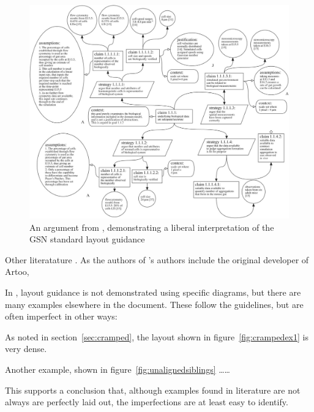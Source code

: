 \begin{itemize*}
\begin{figure}
    \includegraphics[width=\textwidth]{graphics/aldencentral.jpg}
    \caption{An argument from \cite{royal}, demonstrating a liberal interpretation of the GSN standard layout guidance}
    \label{fig:aldencentral}
\end{figure}

Other literatature  . As the authors of \cite{royal}'s authors include the original developer of Artoo, 

In \cite{gsnstandard}, layout guidance is not demonstrated using specific diagrams, but there are many examples elsewhere in the document. These follow the guidelines, but are often imperfect in other ways:

\begin{itemize*}
    \item As noted in section~\ref{sec:cramped}, the layout shown in figure~\ref{fig:crampedex1} is very dense.
    \item Another example, shown in figure~\ref{fig:unalignedsiblings} \ldots \ldots
\end{itemize*}

This supports a conclusion that, although examples found in literature are not always are perfectly laid out, the imperfections are at least easy to identify.


\end{itemize*}
